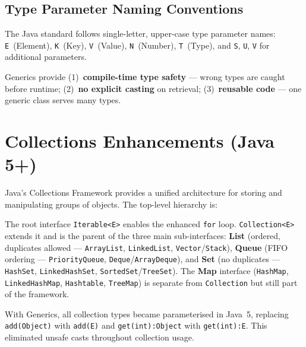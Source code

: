 \documentclass[11pt, a4paper, notitlepage]{report}
\theoremstyle{definition}
\theoremstyle{remark}
\theoremstyle{definition}
\begin{document}
\subsection{Type Parameter Naming Conventions}
\label{subsec:ch10-naming}

The Java standard follows single-letter, upper-case type parameter names:
\texttt{E}~(Element), \texttt{K}~(Key), \texttt{V}~(Value), \texttt{N}~(Number),
\texttt{T}~(Type), and \texttt{S}, \texttt{U}, \texttt{V} for additional parameters.

\begin{keyresult}[title={Key Result: Benefits of Generics}]
Generics provide (1)~\textbf{compile-time type safety} — wrong types are caught before
runtime; (2)~\textbf{no explicit casting} on retrieval; (3)~\textbf{reusable code} —
one generic class serves many types.
\end{keyresult}

\section{Collections Enhancements (Java 5+)}
\label{sec:ch10-collections}

Java's Collections Framework provides a unified architecture for storing and manipulating
groups of objects.  The top-level hierarchy is:

The root interface \texttt{Iterable<E>} enables the enhanced \texttt{for} loop.
\texttt{Collection<E>} extends it and is the parent of the three main sub-interfaces:
\textbf{List} (ordered, duplicates allowed — \texttt{ArrayList}, \texttt{LinkedList},
\texttt{Vector}/\texttt{Stack}), \textbf{Queue} (FIFO ordering —
\texttt{PriorityQueue}, \texttt{Deque}/\texttt{ArrayDeque}), and \textbf{Set} (no
duplicates — \texttt{HashSet}, \texttt{LinkedHashSet}, \texttt{SortedSet}/\texttt{TreeSet}).
The \textbf{Map} interface (\texttt{HashMap}, \texttt{LinkedHashMap}, \texttt{Hashtable},
\texttt{TreeMap}) is separate from \texttt{Collection} but still part of the framework.

With Generics, all collection types became parameterised in Java~5, replacing
\texttt{add(Object)} with \texttt{add(E)} and \texttt{get(int):Object} with
\texttt{get(int):E}.  This eliminated unsafe casts throughout collection usage.
\end{document}
